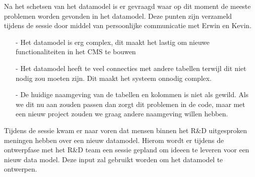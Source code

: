 \whitespace[2]
Na het schetsen van het datamodel is er gevraagd waar op dit moment de meeste problemen worden gevonden in het datamodel.
Deze punten zijn verzameld tijdens de sessie door middel van persoonlijke communicatie met Erwin en Kevin.
\begin{itemize}
    \item[-]{Het datamodel is erg complex, dit maakt het lastig om nieuwe functionaliteiten in het CMS te bouwen}
    \item[-]{Het datamodel heeft te veel connecties met andere tabellen terwijl dit niet nodig zou moeten zijn.
        Dit maakt het systeem onnodig complex.}
    \item[-]{De huidige naamgeving van de tabellen en kolommen is niet als gewild.
        Als we dit nu aan zouden passen dan zorgt dit problemen in de code, maar met een nieuw project zouden we graag andere naamgeving willen hebben.}
\end{itemize}

\whitespace
Tijdens de sessie kwam er naar voren dat mensen binnen het R\&D uitgesproken meningen hebben over een nieuw datamodel.
Hierom wordt er tijdens de ontwerpfase met het R\&D team een sessie gepland om ideeen te leveren voor een nieuw data model.
Deze input zal gebruikt worden om het datamodel te ontwerpen.
%
%
%
%
